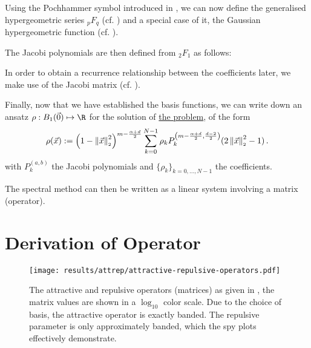 Using the Pochhammer symbol introduced in , we can now define the generalised hypergeometric series ${}_pF_q$ (cf. ) and a special case of it, the Gaussian hypergeometric function (cf. ).



The Jacobi polynomials are then defined from ${}_2F_1$ as follows:




In order to obtain a recurrence relationship between the coefficients later, we make use of the Jacobi matrix (cf. ).


Finally, now that we have established the basis functions, we can write down an ansatz $\rho: B_1(\vec{0}) \mapsto \R$ for the solution of \hyperref[sec:the-problem]{the problem}, of the form
\begin{equation}
  \rho(\vec{x}) := \left(1-\left\lVert\vec{x}\right\rVert_{\scriptscriptstyle 2}^{2}\right)^{m - \frac{\alpha + d}{2}} \sum_{k=0}^{N-1} \rho_k P_{k}^{\left(m - \frac{\alpha + d}{2},\frac{d-2}{2}\right)}(2 \left\lVert\vec{x}\right\rVert_{\scriptscriptstyle 2}^{2}-1)\,.
  \label{eq:ansatz}
\end{equation}
with $P_k^{(a, b)}$ the Jacobi polynomials and $\{\rho_k\}_{k=0, ..., N-1}$ the coefficients.

The spectral method can then be written as a linear system involving a matrix (operator).





\section{Derivation of Operator}


\begin{figure}[H]
  \centering
  \label{fig:attractive-repulsive}
  \texttt{[image: results/attrep/attractive-repulsive-operators.pdf]}
  \caption[Attractive and repulsive operators.]{The attractive and repulsive operators (matrices) as given in , the matrix values are shown in a $\log_{10}$ color scale. Due to the choice of basis, the attractive operator is exactly banded. The repulsive parameter is only approximately banded, which the spy plots effectively demonstrate.}
\end{figure}

